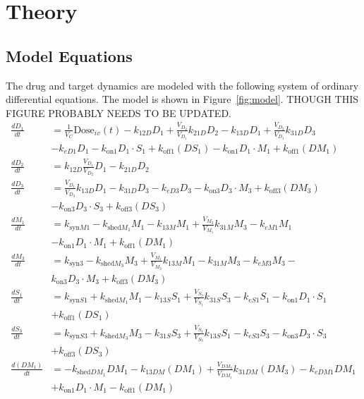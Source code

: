 \section{Theory}

\subsection{Model Equations}
The drug and target dynamics are modeled with the following system of ordinary differential equations.  The model is shown in Figure~\ref{fig:model}.  THOUGH THIS FIGURE PROBABLY NEEDS TO BE UPDATED.
\begin{align}
\frac{dD_1}{dt} &= \frac{1}{V_C}\text{Dose}_{iv}(t) - k_{12D}D_1 + \frac{V_{D_2}}{V_{D_1}}k_{21D}D_2 - k_{13D}D_1 \nonumber 
+ \frac{V_{D_3}}{V_{D_1}}k_{31D}D_3\\& - k_{eD1}D_1 - k_{\text{on}1}D_1 \cdot S_1 + k_{\text{off}1}(DS_1)- k_{\text{on}1}D_1 \cdot M_1 + k_{\text{off}1}(DM_1)  \\
\frac{dD_2}{dt} &= k_{12D}\frac{V_{D_1}}{V_{D_2}}D_1 - k_{21D}D_2 \\
\frac{dD_3}{dt} &= \frac{V_{D_1}}{V_{D_3}}k_{13D}D_1 - k_{31D}D_3 - k_{eD3}D_3- k_{\text{on}3}D_3 \cdot M_3 + k_{\text{off}3}(DM_3)\nonumber  \\&- k_{\text{on}3}D_3 \cdot S_3 + k_{\text{off}3}(DS_3) \\
\frac{dM_1}{dt} &= k_{\text{syn}M1}-k_{\text{shed}M_1}M_1 - k_{13M}M_1 + \frac{V_{M_3}}{V_{M_1}}k_{31M}M_3- k_{eM1}M_1\nonumber  \\&- k_{\text{on}1}D_1 \cdot M_1 + k_{\text{off}1}(DM_1)  \\
\frac{dM_3}{dt} &= k_{\text{syn}3}-k_{\text{shed}M_3}M_3  + \frac{V_{M_1}}{V_{M_3}}k_{13M}M_1 - k_{31M}M_3 - k_{eM3}M_3-\nonumber \\& k_{\text{on}3}D_3 \cdot M_3 + k_{\text{off}3}(DM_3) \\
\frac{dS_1}{dt} &= k_{\text{syn}S1}+k_{\text{shed}M_1}M_1  - k_{13S}S_1 + \frac{V_{S_3}}{V_{S_1}}k_{31S}S_3 - k_{eS1}S_1 - k_{\text{on}1}D_1 \cdot S_1 \nonumber\\ & + k_{\text{off}1}(DS_1)  \\
\frac{dS_3}{dt} &= k_{\text{syn}S3}+k_{\text{shed}M_3}M_3  - k_{31S}S_3 + \frac{V_{S_1}}{V_{S_3}}k_{13S}S_1 - k_{eS3}S_3 - k_{\text{on}3}D_3 \cdot S_3 \nonumber\\ & + k_{\text{off}3}(DS_3)  \\
\frac{d(DM_1)}{dt} &=-k_{\text{shed}DM_1}DM_1 - k_{13DM}(DM_1) + \frac{V_{DM_3}}{V_{DM_1}}k_{31DM}(DM_3)  - k_{eDM1}DM_1\nonumber\\&+k_{\text{on}1}D_1 \cdot M_1 - k_{\text{off}1}(DM_1)  \\

\end{align}
